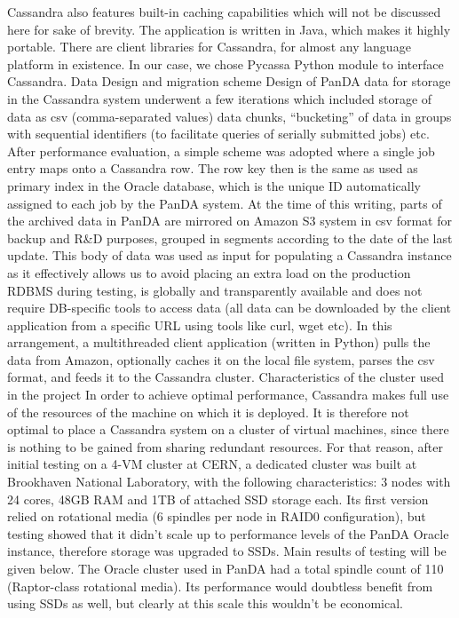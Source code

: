 Cassandra also features built-in caching capabilities which will not be discussed here for sake of brevity. The application is written in Java, which makes it highly portable. There are client libraries for Cassandra, for almost any language platform in existence. In our case, we chose Pycassa Python module to interface Cassandra.
Data Design and migration scheme
Design of PanDA data for storage in the Cassandra system underwent a few iterations which included storage of data as csv (comma-separated values) data chunks, “bucketing” of data in groups with sequential identifiers (to facilitate queries of serially submitted jobs) etc. After performance evaluation, a simple scheme was adopted where a single job entry maps onto a Cassandra row. The row key then is the same as used as primary index in the Oracle database, which is the unique ID automatically assigned to each job by the PanDA system.
At the time of this writing, parts of the archived data in PanDA are mirrored on Amazon S3 system in csv format for backup and R\&D purposes, grouped in segments according to the date of the last update. This body of data was used as input for populating a Cassandra instance as it effectively allows us to avoid placing an extra load on the production RDBMS during testing, is globally and transparently available and does not require DB-specific tools to access data (all data can be downloaded by the client application from a specific URL using tools like curl, wget etc).
In this arrangement, a multithreaded client application (written in Python) pulls the data from Amazon, optionally caches it on the local file system, parses the csv format, and feeds it to the Cassandra cluster.
Characteristics of the cluster used in the project
In order to achieve optimal performance, Cassandra makes full use of the resources of the machine on which it is deployed. It is therefore not optimal to place a Cassandra system on a cluster of virtual machines, since there is nothing to be gained from sharing redundant resources. For that reason, after initial testing on a 4-VM cluster at CERN, a dedicated cluster was built at Brookhaven National Laboratory, with the following characteristics: 3 nodes with 24 cores, 48GB RAM and 1TB of attached SSD storage each. Its first version relied on rotational media (6 spindles per node in RAID0 configuration), but testing showed that it didn’t scale up to performance levels of the PanDA Oracle instance, therefore storage was upgraded to SSDs. Main results of testing will be given below. The Oracle cluster used in PanDA had a total spindle count of 110 (Raptor-class rotational media). Its performance would doubtless benefit from using SSDs as well, but clearly at this scale this wouldn’t be economical.
